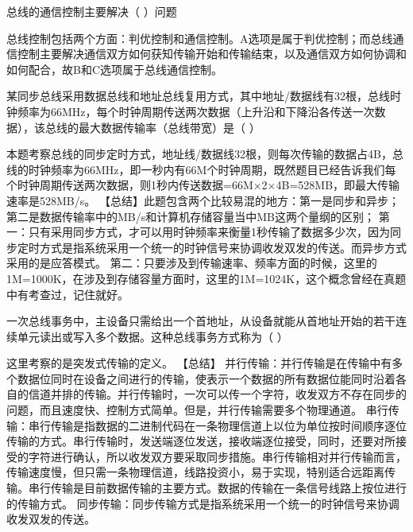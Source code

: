 \question 总线的通信控制主要解决（ ）问题
\par{}
\begin{solution}总线控制包括两个方面：判优控制和通信控制。A选项是属于判优控制；而总线通信控制主要解决通信双方如何获知传输开始和传输结束，以及通信双方如何协调和如何配合，故B和C选项属于总线通信控制。
\end{solution}
\question 某同步总线采用数据总线和地址总线复用方式，其中地址/数据线有32根，总线时钟频率为66MHz，每个时钟周期传送两次数据（上升沿和下降沿各传送一次数据），该总线的最大数据传输率（总线带宽）是（
）
\par{}
\begin{solution}本题考察总线的同步定时方式，地址线/数据线32根，则每次传输的数据占4B，总线的时钟频率为66MHz，即一秒内有66M个时钟周期，既然题目已经告诉我们每个时钟周期传送两次数据，则1秒内传送数据=66M×2×4B=528MB，即最大传输速率是528MB/s。
【总结】此题包含两个比较易混的地方：第一是同步和异步；第二是数据传输率中的MB/s和计算机存储容量当中MB这两个量纲的区别；
第一：只有采用同步方式，才可以用时钟频率来衡量1秒传输了数据多少次，因为同步定时方式是指系统采用一个统一的时钟信号来协调收发双发的传送。而异步方式采用的是应答模式。
第二：只要涉及到传输速率、频率方面的时候，这里的1M=1000K，在涉及到存储容量方面时，这里的1M=1024K，这个概念曾经在真题中有考查过，记住就好。
\end{solution}
\question 一次总线事务中，主设备只需给出一个首地址，从设备就能从首地址开始的若干连续单元读出或写入多个数据。这种总线事务方式称为（
）
\par{}
\begin{solution}这里考察的是突发式传输的定义。 【总结】
并行传输：并行传输是在传输中有多个数据位同时在设备之间进行的传输，使表示一个数据的所有数据位能同时沿着各自的信道并排的传输。并行传输时，一次可以传一个字符，收发双方不存在同步的问题，而且速度快、控制方式简单。但是，并行传输需要多个物理通道。
串行传输：串行传输是指数据的二进制代码在一条物理信道上以位为单位按时间顺序逐位传输的方式。串行传输时，发送端逐位发送，接收端逐位接受，同时，还要对所接受的字符进行确认，所以收发双方要采取同步措施。串行传输相对并行传输而言，传输速度慢，但只需一条物理信道，线路投资小，易于实现，特别适合远距离传输。串行传输是目前数据传输的主要方式。数据的传输在一条信号线路上按位进行的传输方式。
同步传输：同步传输方式是指系统采用一个统一的时钟信号来协调收发双发的传送。
\end{solution}

